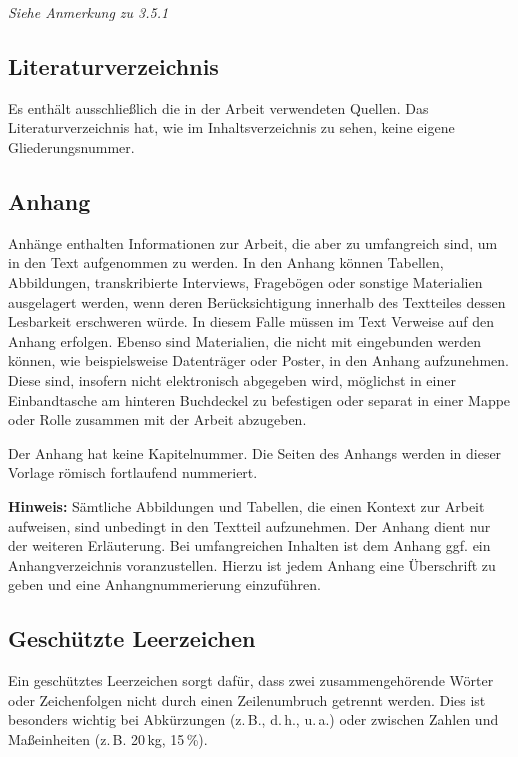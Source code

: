 \textit{Siehe Anmerkung zu 3.5.1}

\subsection{Literaturverzeichnis}

Es enthält ausschließlich die in der Arbeit verwendeten Quellen. Das Literaturverzeichnis hat, wie im Inhaltsverzeichnis zu sehen, keine eigene Gliederungsnummer.

\subsection{Anhang}

Anhänge enthalten Informationen zur Arbeit, die aber zu umfangreich sind, um in den Text aufgenommen zu werden. In den Anhang können Tabellen, Abbildungen, transkribierte Interviews, Fragebögen oder sonstige Materialien ausgelagert werden, wenn deren Berücksichtigung innerhalb des Textteiles dessen Lesbarkeit erschweren würde. In diesem Falle müssen im Text Verweise auf den Anhang erfolgen. Ebenso sind Materialien, die nicht mit eingebunden werden können, wie beispielsweise Datenträger oder Poster, in den Anhang aufzunehmen. Diese sind, insofern nicht elektronisch abgegeben wird, möglichst in einer Einbandtasche am hinteren Buchdeckel zu befestigen oder separat in einer Mappe oder Rolle zusammen mit der Arbeit abzugeben.

Der Anhang hat keine Kapitelnummer. Die Seiten des Anhangs werden in dieser Vorlage römisch fortlaufend nummeriert.

\textbf{Hinweis:} Sämtliche Abbildungen und Tabellen, die einen Kontext zur Arbeit aufweisen, sind unbedingt in den Textteil aufzunehmen. Der Anhang dient nur der weiteren Erläuterung. Bei umfangreichen Inhalten ist dem Anhang ggf. ein Anhangverzeichnis voranzustellen. Hierzu ist jedem Anhang eine Überschrift zu geben und eine Anhangnummerierung einzuführen.

\subsection{Geschützte Leerzeichen}

Ein geschütztes Leerzeichen sorgt dafür, dass zwei zusammengehörende Wörter oder Zeichenfolgen nicht durch einen Zeilenumbruch getrennt werden. Dies ist besonders wichtig bei Abkürzungen (z.\,B., d.\,h., u.\,a.) oder zwischen Zahlen und Maßeinheiten (z.\,B. 20\,kg, 15\,\%).

